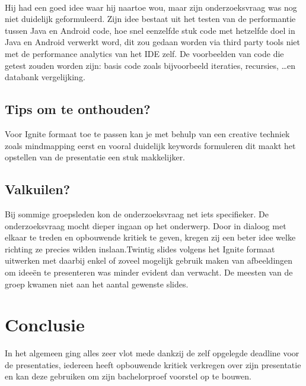 \documentclass[fleqn,10pt]{voorstel}
\begin{document}
\paragraph{\cite{DeCroock2016}}
Hij had een goed idee waar hij naartoe wou, maar zijn onderzoeksvraag was nog niet duidelijk geformuleerd. 
Zijn idee bestaat uit het testen van de performantie tussen Java en Android code, hoe snel eenzelfde stuk code met hetzelfde doel in Java en Android verwerkt word, dit zou gedaan worden via third party tools niet met de performance analytics van het IDE zelf. De voorbeelden van code die getest zouden worden zijn: basis code zoals bijvoorbeeld iteraties, recursies, \dots en databank vergelijking.

\subsection{Tips om te onthouden?}
Voor Ignite formaat toe te passen kan je met behulp van een creative techniek zoals mindmapping eerst en vooral duidelijk keywords formuleren dit maakt het opstellen van de presentatie een stuk makkelijker.

\subsection{Valkuilen?}
Bij sommige groepsleden kon de onderzoeksvraag net iets specifieker. De onderzoeksvraag mocht dieper ingaan op het onderwerp. Door in dialoog met elkaar te treden en opbouwende kritiek te geven, kregen zij een beter idee welke richting ze precies wilden inslaan.Twintig slides volgens het Ignite formaat uitwerken met daarbij enkel of zoveel mogelijk gebruik maken van afbeeldingen om ideeën te presenteren was minder evident dan verwacht. De meesten van de groep kwamen niet aan het aantal gewenste slides.

\section{Conclusie}
In het algemeen ging alles zeer vlot mede dankzij de zelf opgelegde deadline voor de presentaties, iedereen heeft opbouwende kritiek verkregen over zijn presentatie en kan deze gebruiken om zijn bachelorproef voorstel op te bouwen. 


\end{document}
